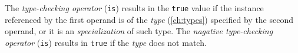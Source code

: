 
The \emph{type-checking operator} (\verb|is|)
results in the \verb|true| value
if the instance referenced by the first operand
is of the \emph{type} (\ref{ch:types}) specified by the second operand,
or it is an \emph{specialization} of such type.
The \emph{nagative type-checking operator} (\verb|is|)
results in \verb|true| if the \emph{type} does not match.
